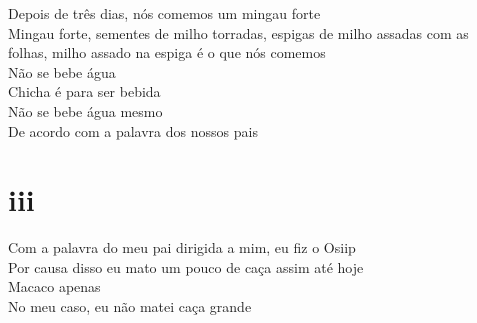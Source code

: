 \begin{linenumbers}\begingroup\raggedright
 
\noindent Depois de três dias, nós comemos um mingau forte\\
 Mingau forte, sementes de milho torradas, espigas de milho assadas com as folhas, milho assado na espiga é o que nós comemos\\
 Não se bebe água\\
 Chicha é para ser bebida\\
 Não se bebe água mesmo\\
 De acordo com a palavra dos nossos pais
 
 
 \medskip
 \section{iii}

 \noindent Com a palavra do meu pai dirigida a mim, eu fiz o Osiip\\
 Por causa disso eu mato um pouco de caça assim até hoje\\
 Macaco apenas\\
 No meu caso, eu não matei caça grande
 
\end{linenumbers}\endgroup

\bigskip

